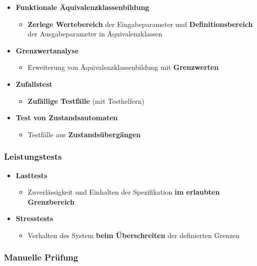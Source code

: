 \documentclass[parskip=full, 12pt]{scrartcl}
\begin{document}
				\begin{itemize}
					\item \textbf{Funktionale Äquivalenzklassenbildung}
					\begin{itemize}
						\item \textbf{Zerlege Wertebereich} der Eingabeparameter und \textbf{Definitionsbereich} der Ausgabeparameter in Äquivalenzklassen
					\end{itemize}
					\item \textbf{Grenzwertanalyse}
					\begin{itemize}
						\item Erweiterung von Äquivalenzklassenbildung mit \textbf{Grenzwerten}
					\end{itemize}
					\item \textbf{Zufallstest}
					\begin{itemize}
						\item \textbf{Zufällige Testfälle} (mit Testhelfern)
					\end{itemize}
					\item \textbf{Test von Zustandsautomaten}
					\begin{itemize}
						\item Testfälle aus \textbf{Zustandsübergängen}
					\end{itemize}
				\end{itemize}
	
			\subsubsection{Leistungstests}
			
				\begin{itemize}
					\item \textbf{Lasttests}
					\begin{itemize}
						\item Zuverlässigkeit und Einhalten der Spezifikation \textbf{im erlaubten Grenzbereich}
					\end{itemize}
					\item \textbf{Stresstests}
					\begin{itemize}
						\item Verhalten des System \textbf{beim Überschreiten} der definierten Grenzen
					\end{itemize}
				\end{itemize}
	
			\subsubsection{Manuelle Prüfung}
	
\end{document}
